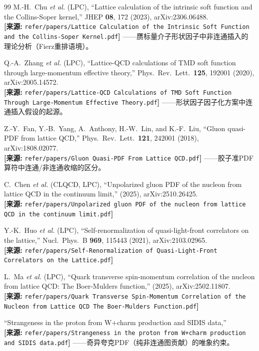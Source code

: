 \documentclass[12pt,a4paper]{ctexart}
\theoremstyle{definition}
\begin{document}
\begin{thebibliography}{99}
M.-H.~Chu \textit{et al.} (LPC),
``Lattice calculation of the intrinsic soft function and the Collins-Soper kernel,''
JHEP \textbf{08}, 172 (2023), arXiv:2306.06488.
\\\textbf{[来源:} \texttt{refer/papers/Lattice Calculation of the Intrinsic Soft Function and the Collins-Soper Kernel.pdf}\textbf{]}
——赝标量介子形状因子中非连通插入的理论分析（Fierz重排语境）。

Q.-A.~Zhang \textit{et al.} (LPC),
``Lattice-QCD calculations of TMD soft function through large-momentum effective theory,''
Phys.\ Rev.\ Lett.\ \textbf{125}, 192001 (2020), arXiv:2005.14572.
\\\textbf{[来源:} \texttt{refer/papers/Lattice-QCD Calculations of TMD Soft Function Through Large-Momentum Effective Theory.pdf}\textbf{]}
——形状因子因子化方案中连通插入假设的起源。

Z.-Y.~Fan, Y.-B.~Yang, A.~Anthony, H.-W.~Lin, and K.-F.~Liu,
``Gluon quasi-PDF from lattice QCD,''
Phys.\ Rev.\ Lett.\ \textbf{121}, 242001 (2018), arXiv:1808.02077.
\\\textbf{[来源:} \texttt{refer/papers/Gluon Quasi-PDF From Lattice QCD.pdf}\textbf{]}
——胶子准PDF算符中连通/非连通收缩的区分。

C.~Chen \textit{et al.} (CLQCD, LPC),
``Unpolarized gluon PDF of the nucleon from lattice QCD in the continuum limit,''
(2025), arXiv:2510.26425.
\\\textbf{[来源:} \texttt{refer/papers/Unpolarized gluon PDF of the nucleon from lattice QCD in the continuum limit.pdf}\textbf{]}

Y.-K.~Huo \textit{et al.} (LPC),
``Self-renormalization of quasi-light-front correlators on the lattice,''
Nucl.\ Phys.\ B \textbf{969}, 115443 (2021), arXiv:2103.02965.
\\\textbf{[来源:} \texttt{refer/papers/Self-Renormalization of Quasi-Light-Front Correlators on the Lattice.pdf}\textbf{]}

L.~Ma \textit{et al.} (LPC),
``Quark transverse spin-momentum correlation of the nucleon from lattice QCD: The Boer-Mulders function,''
(2025), arXiv:2502.11807.
\\\textbf{[来源:} \texttt{refer/papers/Quark Transverse Spin-Momentum Correlation of the Nucleon from Lattice QCD The Boer-Mulders Function.pdf}\textbf{]}

``Strangeness in the proton from W+charm production and SIDIS data,''
\\\textbf{[来源:} \texttt{refer/papers/Strangeness in the proton from W+charm production and SIDIS data.pdf}\textbf{]}
——奇异夸克PDF（纯非连通图贡献）的唯象约束。


\end{thebibliography}
\end{document}
